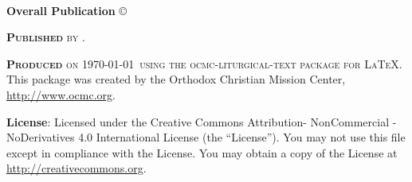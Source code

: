 \newpage
~\vfill
\thispagestyle{empty}

%

%

%

\noindent \textbf{Overall Publication} \copyright\  %

\noindent \textsc{\textbf{Published} by .} %

\noindent \textsc{\textbf{Produced} on \today\ using the ocmc-liturgical-text package for \LaTeX}. This package was created by the Orthodox Christian Mission Center, \url{http://www.ocmc.org}. 

\noindent \textbf{License}: Licensed under the Creative Commons Attribution- NonCommercial - NoDerivatives 4.0 International License (the ``License''). You may not use this file except in compliance with the License. You may obtain a copy of the License at \url{http://creativecommons.org}.
